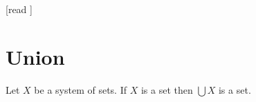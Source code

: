 \documentclass[10pt]{article}
\begin{document}
  \begin{imports}
    \begin{forthel}
      [read ]
    \end{forthel}
  \end{imports}


  \section{Union}

  \begin{forthel}
    \begin{axiom}[title=Union Axiom,id=FOUNDATIONS_10_5536459412996096,printid]
      Let $X$ be a system of sets.
      If $X$ is a set then $\bigcup X$ is a set.
    \end{axiom}
  \end{forthel}
\end{document}
